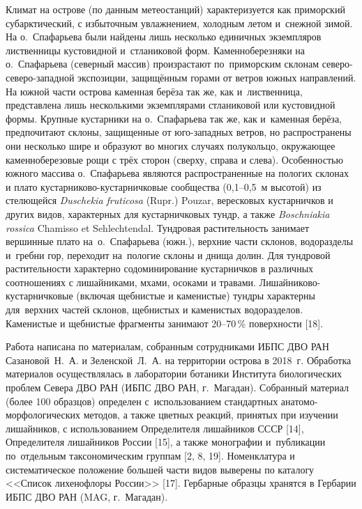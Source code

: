 Климат на острове (по данным метеостанций) характеризуется как приморский субарктический, с избыточным увлажнением, холодным летом и~снежной зимой. На о.~Спафарьева были найдены лишь несколько единичных экземпляров лиственницы кустовидной и~стланиковой форм. Каменноберезняки на о.~Спафарьева (северный массив) произрастают по~приморским склонам северо-северо-западной экспозиции, защищённым горами от ветров южных направлений. На южной части острова каменная берёза так же, как и~лиственница, представлена лишь несколькими экземплярами стланиковой или кустовидной формы. Крупные кустарники на о.~Спафарьева так же, как и~каменная берёза, предпочитают склоны, защищенные от юго-западных ветров, но распространены они несколько шире и образуют во многих случаях полукольцо, окружающее каменноберезовые рощи с трёх сторон (сверху, справа и слева). Особенностью южного массива о.~Спафарьева являются распространенные на пологих склонах и плато кустарниково-кустарничковые сообщества (0,1--0,5~м высотой) из стелющейся \textit{Duschekia fruticosa} (Rupr.) Pouzar, вересковых кустарничков и других видов, характерных для кустарничковых тундр, а также \textit{Boschniakia rossica} Chamisso et Sehlechtendal. Тундровая растительность занимает вершинные плато на~о.~Спафарьева (южн.), верхние части склонов, водоразделы и~гребни гор, переходит на~пологие склоны и днища долин. Для тундровой растительности характерно содоминирование кустарничков в различных соотношениях с лишайниками, мхами, осоками и травами. Лишайниково-кустарничковые (включая щебнистые и каменистые) тундры характерны для~верхних частей склонов, щебнистых и каменистых водоразделов. Каменистые и щебнистые фрагменты занимают 20--70\,\% поверхности [18].
\clearpage



Работа написана по материалам, собранным сотрудниками ИБПС ДВО РАН Сазановой~Н.~А. и Зеленской~Л.~А. на территории острова в 2018~г. Обработка материалов осуществлялась в лаборатории ботаники Института биологических проблем Севера ДВО РАН (ИБПС ДВО РАН, г.~Магадан). Собранный материал (более 100 образцов) определен с~использованием стандартных анатомо-морфологических методов, а также цветных реакций, принятых при изучении лишайников, с использованием Определителя лишайников СССР [14], Определителя лишайников России [15], а также монографии и~публикации по~отдельным таксономическим группам [2, 8, 19]. Номенклатура и систематическое положение большей части видов выверены по каталогу <<Список лихенофлоры России>> [17]. Гербарные образцы хранятся в Гербарии ИБПС ДВО РАН (MAG, г.~Магадан).


